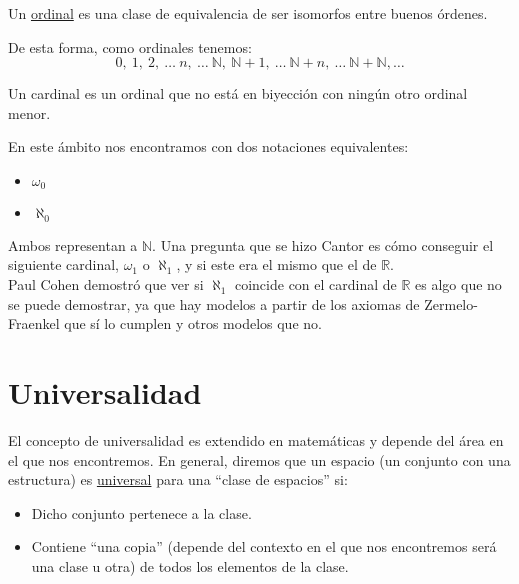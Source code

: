 \begin{definicion}[Ordinal]
    Un \underline{ordinal} es una clase de equivalencia de ser isomorfos entre buenos órdenes.
\end{definicion}
De esta forma, como ordinales tenemos:
\begin{equation*}
    0,\ 1,\ 2,\ \ldots\ n,\ \ldots \ \mathbb{N},\ \mathbb{N}+1,\ \ldots \ \mathbb{N}+n,\ \ldots \ \mathbb{N}+\mathbb{N}, \ldots 
\end{equation*}

\begin{definicion}[Cardinal]
    Un cardinal es un ordinal que no está en biyección con ningún otro ordinal menor.
\end{definicion}

\begin{notacion}
    En este ámbito nos encontramos con dos notaciones equivalentes:
    \begin{itemize}
        \item $\omega_0$
        \item $\aleph_0$
    \end{itemize}
    Ambos representan a $\mathbb{N}$. Una pregunta que se hizo Cantor es cómo conseguir el siguiente cardinal, $\omega_1$ o $\aleph_1$, y si este era el mismo que el de $\mathbb{R}$.\\

    \noindent
    Paul Cohen demostró que ver si $\aleph_1$ coincide con el cardinal de $\mathbb{R}$ es algo que no se puede demostrar, ya que hay modelos a partir de los axiomas de Zermelo-Fraenkel que sí lo cumplen y otros modelos que no.
\end{notacion}

\section{Universalidad}
\noindent
El concepto de universalidad es extendido en matemáticas y depende del área en el que nos encontremos. En general, diremos que un espacio (un conjunto con una estructura) es \underline{universal} para una ``clase de espacios'' si:
\begin{itemize}
    \item Dicho conjunto pertenece a la clase.
    \item Contiene ``una copia'' (depende del contexto en el que nos encontremos será una clase u otra) de todos los elementos de la clase.
\end{itemize}

